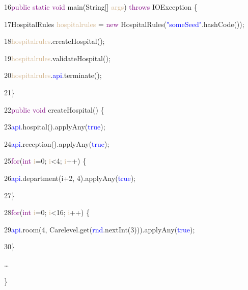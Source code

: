 {{16\hspace{1cm}\textcolor{Purple}{public static void} main(String[] \textcolor{Tan}{args}) \textcolor{Purple}{throws} IOException \{

17\hspace{1.5cm}HospitalRules \textcolor{Tan}{hospitalrules} = \textcolor{Purple}{new} HospitalRules(\textcolor{blue}{"someSeed"}.hashCode());

18\hspace{1.5cm}\textcolor{Tan}{hospitalrules}.createHospital();

19\hspace{1.5cm}\textcolor{Tan}{hospitalrules}.validateHospital();

20\hspace{1.5cm}\textcolor{Tan}{hospitalrules}.\textcolor{blue}{api}.terminate();

21\hspace{0.5cm}\}

22\hspace{0.5cm}\textcolor{Purple}{public void} createHospital() \{

23\hspace{1cm}\textcolor{blue}{api}.hospital().applyAny(\textcolor{blue}{true});

24\hspace{1cm}\textcolor{blue}{api}.reception().applyAny(\textcolor{blue}{true});

25\hspace{1cm}\textcolor{Purple}{for}(\textcolor{Purple}{int} \textcolor{Tan}{i}=0; \textcolor{Tan}{i}<4; \textcolor{Tan}{i}++) \{

26\hspace{1.5cm}\textcolor{blue}{api}.department(i+2, 4).applyAny(\textcolor{blue}{true});

27\hspace{1cm}\}

28\hspace{1cm}\textcolor{Purple}{for}(\textcolor{Purple}{int} \textcolor{Tan}{i}=0; \textcolor{Tan}{i}<16; \textcolor{Tan}{i}++) \{

29\hspace{1.5cm}\textcolor{blue}{api}.room(4, Carelevel.get(\textcolor{blue}{rnd}.nextInt(3))).applyAny(\textcolor{blue}{true});

30\hspace{1cm}\} 

\hspace{0.7cm}…

\hspace{0.7cm}\}

}}
